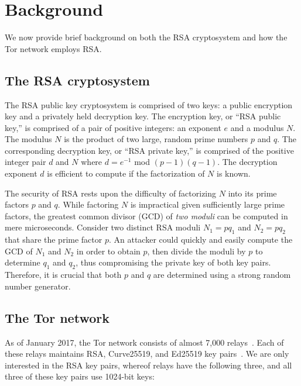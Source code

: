 \section{Background}
\label{sec:background}
We now provide brief background on both the RSA cryptosystem and how the Tor
network employs RSA.

\subsection{The RSA cryptosystem}
The RSA public key cryptosystem is comprised of two keys: a public encryption
key and a privately held decryption key. The encryption key, or ``RSA public
key,'' is comprised of a pair of positive integers: an exponent $e$ and a modulus
$N$. The modulus $N$ is the product of two large, random prime numbers $p$ and
$q$. The corresponding decryption key, or ``RSA private key,'' is comprised of the
positive integer pair $d$ and $N$ where $d = e^{-1}$ mod $(p - 1)(q - 1)$.  The
decryption exponent $d$ is efficient to compute if the factorization of $N$ is
known.

The security of RSA rests upon the difficulty of factorizing $N$ into its prime
factors $p$ and $q$.  While factoring $N$ is impractical given sufficiently
large prime factors, the greatest common divisor (GCD) of \emph{two moduli} can
be computed in mere microseconds.  Consider two distinct RSA moduli $N_1 = pq_1$
and $N_2 = pq_2$ that share the prime factor $p$.  An attacker could quickly and
easily compute the GCD of $N_1$ and $N_2$ in order to obtain $p$, then divide
the moduli by $p$ to determine $q_1$ and $q_2$, thus compromising the private
key of both key pairs.  Therefore, it is crucial that both $p$ and $q$ are
determined using a strong random number generator.

\subsection{The Tor network}
As of January 2017, the Tor network consists of almost 7,000
relays~\cite{tormetrics}.  Each of these relays maintains RSA, Curve25519, and
Ed25519 key pairs~\cite[\S~1.1]{torspec}.  We are only interested in the
RSA key pairs, whereof relays have the following three, and all three 
of these key pairs use 1024-bit keys:

